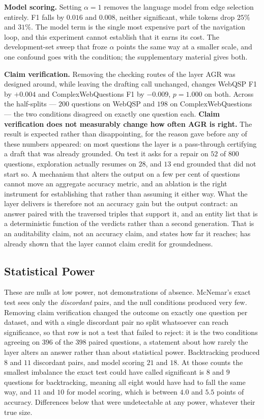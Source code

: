 \textbf{Model scoring.} Setting $\alpha = 1$ removes the language model
from edge selection entirely. F1 falls by $0.016$ and $0.008$, neither
significant, while tokens drop $25\%$ and $31\%$. The model term is the
single most expensive part of the navigation loop, and this experiment
cannot establish that it earns its cost. The development-set sweep that
froze $\alpha$ points the same way at a smaller scale, and one confound
goes with the condition; the supplementary material gives both.

\textbf{Claim verification.} Removing the checking routes of the layer
AGR was designed around, while leaving the drafting call unchanged,
changes WebQSP F1 by $+0.004$ and ComplexWebQuestions F1 by $-0.009$, $p
= 1.000$ on both. Across the half-splits --- $200$ questions on WebQSP
and $198$ on ComplexWebQuestions --- the two conditions disagreed on
exactly one question each. \textbf{Claim verification does not
measurably change how often AGR is right.} The result is expected rather
than disappointing, for the reason  gave before
any of these numbers appeared: on most questions the layer is a
pass-through certifying a draft that was already grounded. On test it
asks for a repair on $52$ of $800$ questions, exploration actually
resumes on $28$, and $13$ end grounded that did not start so. A
mechanism that alters the output on a few per cent of questions cannot
move an aggregate accuracy metric, and an ablation is the right
instrument for establishing that rather than assuming it either way.
What the layer delivers is therefore not an accuracy gain but the output
contract: an answer paired with the traversed triples that support it,
and an entity list that is a deterministic function of the verdicts
rather than a second generation. That is an auditability claim, not an
accuracy claim, and  states how far it
reaches;  has already shown that the layer cannot
claim credit for groundedness.

\subsection{Statistical Power}\label{sec:power}

These are nulls at low power, not demonstrations of absence. McNemar's
exact test sees only the \emph{discordant} pairs, and the null
conditions produced very few. Removing claim verification changed the
outcome on exactly one question per dataset, and with a single
discordant pair no split whatsoever can reach significance, so that row
is not a test that failed to reject: it is the two conditions agreeing
on $396$ of the $398$ paired questions, a statement about how rarely the
layer alters an answer rather than about statistical power. Backtracking
produced $8$ and $11$ discordant pairs, and model scoring $21$ and $18$.
At those counts the smallest imbalance the exact test could have called
significant is $8$ and $9$ questions for backtracking, meaning all eight
would have had to fall the same way, and $11$ and $10$ for model
scoring, which is between $4.0$ and $5.5$ points of accuracy.
Differences below that were undetectable at any power, whatever their
true size.

